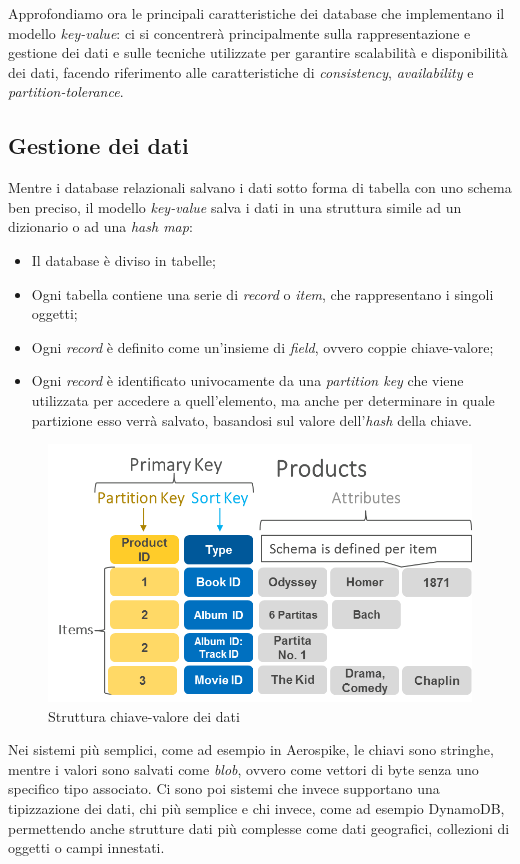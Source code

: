 Approfondiamo ora le principali caratteristiche dei database che implementano il modello \textit{key-value}: ci si concentrerà principalmente sulla rappresentazione e gestione dei dati e sulle tecniche utilizzate per garantire scalabilità e disponibilità dei dati, facendo riferimento alle caratteristiche di \textit{consistency}, \textit{availability} e \textit{partition-tolerance}.

\subsection{Gestione dei dati}
Mentre i database relazionali salvano i dati sotto forma di tabella con uno schema ben preciso, il modello \textit{key-value} salva i dati in una struttura simile ad un dizionario o ad una \textit{hash map}:
\begin{itemize}
    \item Il database è diviso in tabelle;
    \item Ogni tabella contiene una serie di \textit{record} o \textit{item}, che rappresentano i singoli oggetti;
    \item Ogni \textit{record} è definito come un'insieme di \textit{field}, ovvero coppie chiave-valore;
    \item Ogni \textit{record} è identificato univocamente da una \textit{partition key} che viene utilizzata per accedere a quell'elemento, ma anche per determinare in quale partizione esso verrà salvato, basandosi sul valore dell'\textit{hash} della chiave.
\end{itemize}

\begin{figure}[!ht]
    \centering
    \includegraphics[width=.8\textwidth]{images/chiavevalore.png}
    \caption{Struttura chiave-valore dei dati}
    \label{fig:keyval}
\end{figure}

Nei sistemi più semplici, come ad esempio in Aerospike, le chiavi sono stringhe, mentre i valori sono salvati come \textit{blob}, ovvero come vettori di byte senza uno specifico tipo associato. Ci sono poi sistemi che invece supportano una tipizzazione dei dati, chi più semplice e chi invece, come ad esempio DynamoDB, permettendo anche strutture dati più complesse come dati geografici, collezioni di oggetti o campi innestati.

